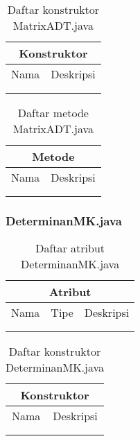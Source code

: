 \begin{table}[H]
    \centering
    \begin{tabular}{c|c}
        \hline
        \hline
        \multicolumn{2}{c}{\textbf{Konstruktor}}\\
        \hline
        \hline
         Nama  & Deskripsi \\
         \hline 
         \hline 
         &  \\
         &  \\
    \end{tabular}
    \caption{Daftar konstruktor MatrixADT.java}
\end{table}

\begin{table}[H]
    \centering
    \begin{tabular}{c|c}
        \hline
        \hline
        \multicolumn{2}{c}{\textbf{Metode}}\\
        \hline
        \hline
         Nama  & Deskripsi \\
         \hline 
         \hline 
         &  \\
         &  \\
    \end{tabular}
    \caption{Daftar metode MatrixADT.java}
\end{table}

\subsubsection{DeterminanMK.java}

\begin{table}[H]
    \centering
    \begin{tabular}{c|c|c}
        \hline
        \hline
        \multicolumn{3}{c}{\textbf{Atribut}}\\
        \hline
        \hline
         Nama & Tipe & Deskripsi \\
         \hline 
         \hline 
         &  & \\
         &  & \\
    \end{tabular}
    \caption{Daftar atribut DeterminanMK.java}
\end{table}

\begin{table}[H]
    \centering
    \begin{tabular}{c|c}
        \hline
        \hline
        \multicolumn{2}{c}{\textbf{Konstruktor}}\\
        \hline
        \hline
         Nama  & Deskripsi \\
         \hline 
         \hline 
         &  \\
         &  \\
    \end{tabular}
    \caption{Daftar konstruktor DeterminanMK.java}
\end{table}

